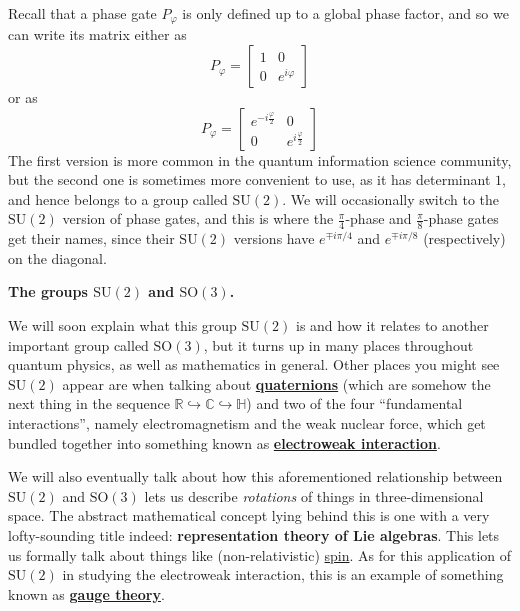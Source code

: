 \documentclass[fleqn,a4paper]{article}
\newenvironment{technical}[1]{\textbf{#1.}\par\vspace{.5\baselineskip}\everypar{\setlength{\parindent}{1.5em}}}{}
\theoremstyle{definition}
\theoremstyle{definition}
\theoremstyle{definition}
\theoremstyle{definition}
\theoremstyle{remark}
\begin{document}
Recall that a phase gate \(P_\varphi\) is only defined up to a global phase factor, and so we can write its matrix either as
\[
  P_\varphi =
  \begin{bmatrix}
    1 & 0
  \\0 & e^{i\varphi}
  \end{bmatrix}
\]
or as
\[
  P_\varphi =
  \begin{bmatrix}
    e^{-i\frac{\varphi}{2}} & 0
  \\0 & e^{i\frac{\varphi}{2}}
  \end{bmatrix}
\]
The first version is more common in the quantum information science community, but the second one is sometimes more convenient to use, as it has determinant \(1\), and hence belongs to a group called \(\mathrm{SU}(2)\).
We will occasionally switch to the \(\mathrm{SU}(2)\) version of phase gates, and this is where the \(\frac{\pi}{4}\)-phase and \(\frac{\pi}{8}\)-phase gates get their names, since their \(\mathrm{SU}(2)\) versions have \(e^{\mp i\pi/4}\) and \(e^{\mp i\pi/8}\) (respectively) on the diagonal.

\begin{technical}{The groups $\mathrm{SU}(2)$ and $\mathrm{SO}(3)$}
We will soon explain what this group \(\mathrm{SU}(2)\) is and how it relates to another important group called \(\mathrm{SO}(3)\), but it turns up in many places throughout quantum physics, as well as mathematics in general.
Other places you might see \(\mathrm{SU}(2)\) appear are when talking about \href{https://en.wikipedia.org/wiki/Quaternion}{\textbf{quaternions}} (which are somehow the next thing in the sequence \(\mathbb{R}\hookrightarrow\mathbb{C}\hookrightarrow\mathbb{H}\)) and two of the four ``fundamental interactions'', namely electromagnetism and the weak nuclear force, which get bundled together into something known as \href{https://en.wikipedia.org/wiki/Electroweak_interaction}{\textbf{electroweak interaction}}.

We will also eventually talk about how this aforementioned relationship between \(\mathrm{SU}(2)\) and \(\mathrm{SO}(3)\) lets us describe \emph{rotations} of things in three-dimensional space.
The abstract mathematical concept lying behind this is one with a very lofty-sounding title indeed: \textbf{representation theory of Lie algebras}.
This lets us formally talk about things like (non-relativistic) \href{https://en.wikipedia.org/wiki/Spin_(physics)}{spin}.
As for this application of \(\mathrm{SU}(2)\) in studying the electroweak interaction, this is an example of something known as \href{https://en.wikipedia.org/wiki/Gauge_theory}{\textbf{gauge theory}}.

\end{technical}
\end{document}
